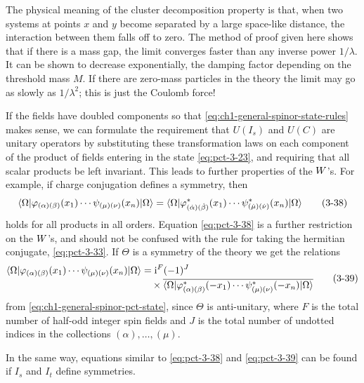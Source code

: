 The physical meaning of the cluster decomposition property is that, when two
systems at points $x$ and $y$ become separated by a large space-like distance,
the interaction between them falls off to zero. The method of proof given
here shows that if there is a mass gap, the limit converges faster than any
inverse power $1/\lambda$. It can be shown to decrease exponentially, the
damping factor depending on the threshold mass $M$. If there are zero-mass
particles in the theory the limit may go as slowly as $1/\lambda^2$; this is
just the Coulomb force!

If the fields have doubled components so that \eqref{eq:ch1-general-spinor-state-rules} makes sense, we can
formulate the requirement that $U(I_s)$ and $U(C)$ are unitary operators by
substituting these transformation laws on each component of the product of
fields entering in the state \eqref{eq:pct-3-23}, and requiring that all scalar products be
left invariant. This leads to further properties of the $W$'s. For
example, if charge conjugation defines a symmetry, then
\begin{equation}
 \langle \Omega\rvert\varphi_{(\alpha)(\beta)}(x_1)\cdots
 \psi_{(\mu)(\nu)}(x_n)\lvert \Omega\rangle
 =\langle \Omega\rvert\varphi^*_{(\dot\alpha)(\dot\beta)}(x_1)\cdots
 \psi^*_{(\dot\mu)(\dot\nu)}(x_n)\lvert \Omega\rangle
 \tag{3-38}\label{eq:pct-3-38}
\end{equation}
holds for all products in all orders. Equation \eqref{eq:pct-3-38} is a further
restriction on the $W$'s, and should not be confused with the rule
for taking the hermitian conjugate, \eqref{eq:pct-3-33}. If $\Theta$ is a symmetry of the
theory we get the relations
\begin{equation}
 \begin{aligned}
  \langle \Omega\rvert\varphi_{(\alpha)(\beta)}(x_1)\cdots
  \psi_{(\mu)(\nu)}(x_n)\lvert \Omega\rangle
  &=\mathrm{i}^F(-1)^J\\[-2pt]
  &\quad\times\overline{\langle \Omega\rvert\varphi^*_{(\alpha)(\beta)}(-x_1)\cdots
  \psi^*_{(\mu)(\nu)}(-x_n)\lvert \Omega\rangle}
 \end{aligned}
\tag{3-39}\label{eq:pct-3-39}
\end{equation}
from \eqref{eq:ch1-general-spinor-pct-state}, since $\Theta$ is anti-unitary, where $F$ is the total number
of half-odd integer spin fields and $J$ is the total number of undotted
indices in the collections $(\alpha),\ldots,(\mu)$.

In the same way, equations similar to \eqref{eq:pct-3-38} and \eqref{eq:pct-3-39} can be found if
$I_s$ and $I_t$ define symmetries.

